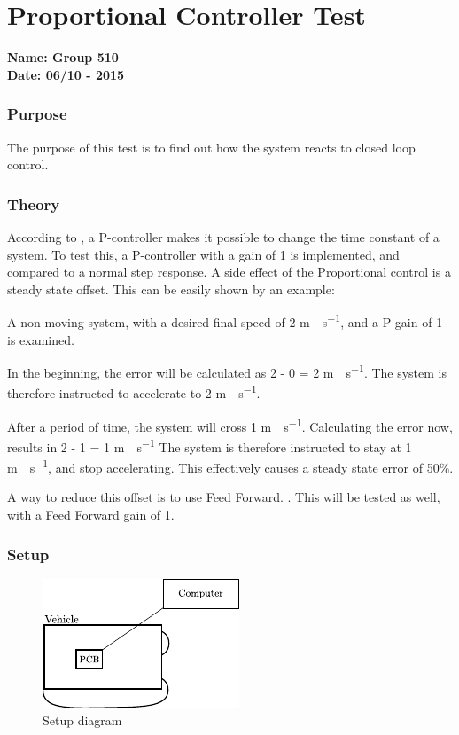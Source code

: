 \pagebreak
\section{Proportional Controller Test} \label{app:proportionalControllerTest}
\textbf{Name: Group 510}\\
\textbf{Date: 06/10 - 2015}

\subsubsection{Purpose}
The purpose of this test is to find out how the system reacts to closed loop control.

\subsubsection{Theory}
According to , a P-controller makes it possible to change the time constant of a system. To test this, a P-controller with a gain of 1 is implemented, and compared to a normal step response.
A side effect of the Proportional control is a steady state offset. This can be easily shown by an example:

A non moving system, with a desired final speed of 2 \si{m \cdot s^{-1}}, and a P-gain of 1 is examined.

In the beginning, the error will be calculated as 2 - 0 = 2 \si{m \cdot s^{-1}}. The system is therefore instructed to accelerate to 2 \si{m \cdot s^{-1}}.

After a period of time, the system will cross 1 \si{m \cdot s^{-1}}. Calculating the error now, results in 2 - 1 = 1 \si{m \cdot s^{-1}}
The system is therefore instructed to stay at 1 \si{m \cdot s^{-1}}, and stop accelerating. This effectively causes a steady state error of 50\%.

A way to reduce this offset is to use Feed Forward. . This will be tested as well, with a Feed Forward gain of 1.

\subsubsection{Setup}

\begin{figure}[H]
	\centering
	\includegraphics[scale=1.6]{figures/inertiaTestSetupDiagram2.pdf}
	\caption{Setup diagram}
	\label{GainAndTimeTestSetupDiagram}
\end{figure}

